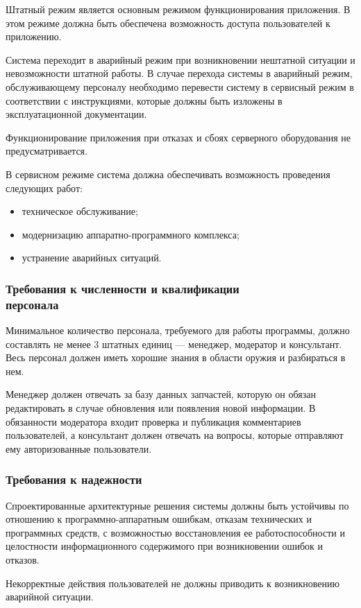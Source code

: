 \documentclass[14pt]{extreport}
\begin{document}
Штатный режим является основным режимом функционирования приложения. В этом режиме должна быть обеспечена возможность доступа пользователей 
к приложению.

Система переходит в аварийный режим при возникновении нештатной ситуации и невозможности штатной работы. В случае перехода системы в аварийный режим, обслуживающему персоналу необходимо перевести систему в сервисный режим 
в соответствии с инструкциями, которые должны быть изложены в эксплуатационной документации.

Функционирование приложения при отказах и сбоях серверного оборудования не предусматривается.

В сервисном режиме система должна обеспечивать возможность проведения следующих работ:
\begin{itemize}
	\item техническое обслуживание;
	\item модернизацию аппаратно-программного комплекса;
	\item устранение аварийных ситуаций.
\end{itemize}

\subsubsection{Требования к численности и квалификации \\ персонала}
Минимальное количество персонала, требуемого для работы программы, должно
составлять не менее 3 штатных единиц — менеджер, модератор и консультант. Весь персонал должен иметь хорошие знания в области оружия и разбираться в нем.

Менеджер должен отвечать за базу данных запчастей, которую он обязан редактировать в случае обновления или появления новой информации.  В обязанности модератора входит проверка и публикация комментариев пользователей, а консультант должен отвечать на вопросы, которые отправляют ему авторизованные пользователи.

\subsubsection{Требования к надежности}
Спроектированные архитектурные решения системы должны быть устойчивы по отношению к программно-аппаратным ошибкам, отказам технических и программных средств, с возможностью восстановления ее работоспособности и целостности информационного содержимого при возникновении ошибок и отказов.

Некорректные действия пользователей не должны приводить к возникновению аварийной ситуации.
\end{document}
